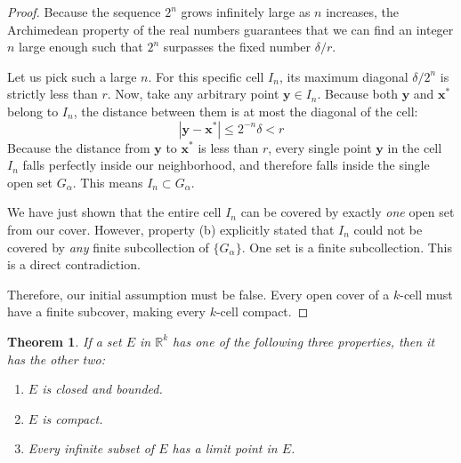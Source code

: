 \documentclass{article}
\theoremstyle{mythm}
\newtheorem{theorem}{Theorem}[section]
\begin{document}
\begin{proof}
Because the sequence $2^n$ grows infinitely large as $n$ increases, the Archimedean property of the real numbers guarantees that we can find an integer $n$ large enough such that $2^n$ surpasses the fixed number $\delta/r$. 

Let us pick such a large $n$. For this specific cell $I_n$, its maximum diagonal $\delta / 2^n$ is strictly less than $r$. 
Now, take any arbitrary point $\mathbf{y} \in I_n$. Because both $\mathbf{y}$ and $\mathbf{x}^*$ belong to $I_n$, the distance between them is at most the diagonal of the cell:
\[ |\mathbf{y} - \mathbf{x}^*| \le 2^{-n}\delta < r \]
Because the distance from $\mathbf{y}$ to $\mathbf{x}^*$ is less than $r$, every single point $\mathbf{y}$ in the cell $I_n$ falls perfectly inside our neighborhood, and therefore falls inside the single open set $G_\alpha$. 
This means $I_n \subset G_\alpha$.

We have just shown that the entire cell $I_n$ can be covered by exactly \textit{one} open set from our cover. However, property (b) explicitly stated that $I_n$ could not be covered by \textit{any} finite subcollection of $\{G_\alpha\}$. 
One set is a finite subcollection. This is a direct contradiction. 

Therefore, our initial assumption must be false. Every open cover of a $k$-cell must have a finite subcover, making every $k$-cell compact.
\end{proof}
\begin{theorem}
If a set $E$ in $\mathbb{R}^k$ has one of the following three properties, then it has the other two:
\begin{enumerate}[label=(\alph*)]
    \item $E$ is closed and bounded.
    \item $E$ is compact.
    \item Every infinite subset of $E$ has a limit point in $E$.
\end{enumerate}
\end{theorem}
\end{document}

